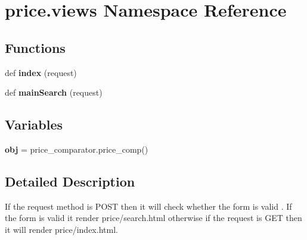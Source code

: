 \hypertarget{namespaceprice_1_1views}{}\section{price.\+views Namespace Reference}
\label{namespaceprice_1_1views}
\subsection*{Functions}
\begin{DoxyCompactItemize}
\item 
\mbox{\label{namespaceprice_1_1views_add72e229a76462ef2a5956657f5ccd66}} 
def {\bfseries index} (request)
\item 
\mbox{\label{namespaceprice_1_1views_aca2abdd74274fedb273a7fc45cfeb3f2}} 
def {\bfseries main\+Search} (request)
\end{DoxyCompactItemize}
\subsection*{Variables}
\begin{DoxyCompactItemize}
\item 
\mbox{\label{namespaceprice_1_1views_a9455467175043e5bd871cd9e7f3f6a5a}} 
{\bfseries obj} = price\+\_\+comparator.\+price\+\_\+comp()
\end{DoxyCompactItemize}


\subsection{Detailed Description}
\begin{DoxyVerb}If the request method is POST then it will check whether the form is valid . If the form is valid it render price/search.html otherwise if the request is GET then it will render price/index.html.
\end{DoxyVerb}
 